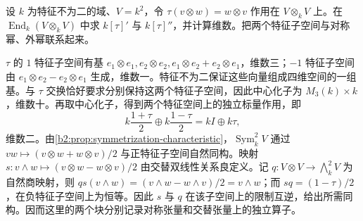 \begin{exercise}\label{b2:ex:11-tensor-flip-centralizer}
	设 \(k\) 为特征不为二的域、\(V=k^2\)，令 \(\tau(v\otimes w)=w\otimes v\) 作用在 \(V\otimes_kV\) 上。在 \(\operatorname{End}_k(V\otimes_kV)\) 中求 \(k[\tau]'\) 与 \(k[\tau]''\)，并计算维数。把两个特征子空间与对称幂、外幂联系起来。
\end{exercise}
\begin{solution}
	\(\tau\) 的 \(1\) 特征子空间有基 \(e_1\otimes e_1,e_2\otimes e_2,e_1\otimes e_2+e_2\otimes e_1\)，维数三；\(-1\) 特征子空间由 \(e_1\otimes e_2-e_2\otimes e_1\) 生成，维数一。特征不为二保证这些向量组成四维空间的一组基。与 \(\tau\) 交换恰好要求分别保持这两个特征子空间，因此中心化子为 \(M_3(k)\times k\)，维数十。再取中心化子，得到两个特征空间上的独立标量作用，即
	\[
		k\frac{1+\tau}{2}\oplus k\frac{1-\tau}{2}=kI\oplus k\tau,
	\]
	维数二。由\cref{b2:prop:symmetrization-characteristic}，\(\operatorname{Sym}^2_kV\) 通过 \(vw\mapsto(v\otimes w+w\otimes v)/2\) 与正特征子空间自然同构。映射 \(s:v\wedge w\mapsto(v\otimes w-w\otimes v)/2\) 由交替双线性关系良定义。记 \(q:V\otimes V\to\bigwedge^2_kV\) 为自然商映射，则 \(qs(v\wedge w)=(v\wedge w-w\wedge v)/2=v\wedge w\)；而 \(sq=(1-\tau)/2\)，在负特征子空间上为恒等。因此 \(s\) 与 \(q\) 在该子空间上的限制互逆，给出所需同构。因而这里的两个块分别记录对称张量和交替张量上的独立算子。
\end{solution}
